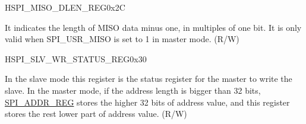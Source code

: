 \begin{register}{H}{SPI\_MISO\_DLEN\_REG}{0x2C}\label{regdesc:SPIMISODLENREG}
%
%
\regnewline%
\begin{regdesc}\begin{reglist}
\item [SPI\_USR\_MISO\_DBITLEN]It indicates the length of MISO data minus one, in multiples of one bit. It is only valid when SPI\_USR\_MISO is set to 1 in master mode. (R/W)
\end{reglist}\end{regdesc}
\end{register}


\begin{register}{H}{SPI\_SLV\_WR\_STATUS\_REG}{0x30}\label{regdesc:SPISLVWRSTATUSREG}
%
\regnewline%
\begin{regdesc}\begin{reglist}
\item [SPI\_SLV\_WR\_STATUS\_REG]In the slave mode this register is the status register for the master to write the slave. In the master mode, if the address length is bigger than 32 bits, \hyperref[regdesc:SPIADDRREG]{SPI\_ADDR\_REG} stores the higher 32 bits of address value, and this register stores the rest lower part of address value. (R/W)
\end{reglist}\end{regdesc}
\end{register}

